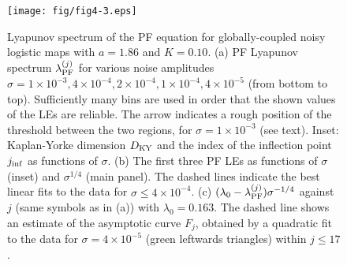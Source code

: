 \documentclass[12pt]{iopart}
\begin{document}
\begin{figure}[t]
  \texttt{[image: fig/fig4-3.eps]}
  \caption{Lyapunov spectrum of the PF equation for globally-coupled noisy logistic maps  with $a=1.86$ and $K=0.10$. (a) PF Lyapunov spectrum $\lambda_{\rm PF}^{(j)}$ for various noise amplitudes
 $\sigma = 1 \times 10^{-3}, 4 \times 10^{-4}, 2 \times 10^{-4}, 1 \times 10^{-4}, 4 \times 10^{-5}$ (from bottom to top).
Sufficiently many bins are used in order that the shown values of the LEs are reliable.
The arrow indicates a rough position of the threshold between the two regions, for $\sigma = 1 \times 10^{-3}$ (see text).
Inset: Kaplan-Yorke dimension $D_{\rm KY}$ and the index of the inflection point $j_{\rm inf}$ as functions of $\sigma$. (b) The first three PF LEs as functions of $\sigma$ (inset) and $\sigma^{1/4}$ (main panel). The dashed lines indicate the best linear fits to the data for $\sigma \leq 4 \times 10^{-4}$. (c) $(\lambda_0 - \lambda_{\rm PF}^{(j)}) \sigma^{-1/4}$ against $j$ (same symbols as in (a)) with $\lambda_0 = 0.163$.
The dashed line shows an estimate of the asymptotic curve $F_j$, obtained by a quadratic fit to the data for $\sigma = 4 \times 10^{-5}$ (green leftwards triangles) within $j \leq 17$.}
  \label{fig:4-3}
\end{figure}%
\end{document}
